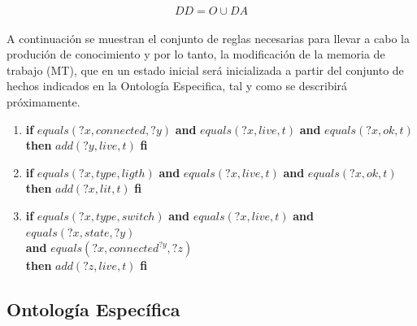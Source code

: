 \documentclass[10pt, a4paper,spanish]{article}
\begin{document}
			\begin{equation*}
				DD = O \cup DA
			\end{equation*}

			\paragraph{}
			A continuación se muestran el conjunto de reglas necesarias para llevar a cabo la produción de conocimiento y por lo tanto, la modificación de la memoria de trabajo (MT), que en un estado inicial será inicializada a partir del conjunto de hechos indicados en la Ontología Especifica, tal y como se describirá próximamente.

			\begin{enumerate}[label={\textbf{R\theenumi:}}]
				\item
					\textbf{if} $equals(?x, connected, ?y)$ \textbf{and} $equals(?x, live, t)$ \textbf{and} $equals(?x, ok, t)$ \\
					\textbf{then} $add(?y, live, t)$ \textbf{fi}

				\item
					\textbf{if} $equals(?x, type, ligth)$ \textbf{and} $equals(?x, live, t)$ \textbf{and} $equals(?x, ok, t)$ \\
					\textbf{then} $add(?x, lit, t)$ \textbf{fi}

				\item
					\textbf{if} $equals(?x, type, switch)$ \textbf{and} $equals(?x, live, t)$ \textbf{and} $equals(?x, state, ?y)$ \\
					\hspace*{0.5cm} \textbf{and} $equals(?x, connected^{?y}, ?z)$ \\
					\textbf{then} $add(?z, live, t)$ \textbf{fi}

			\end{enumerate}


		\subsection{Ontología Específica}
\end{document}
